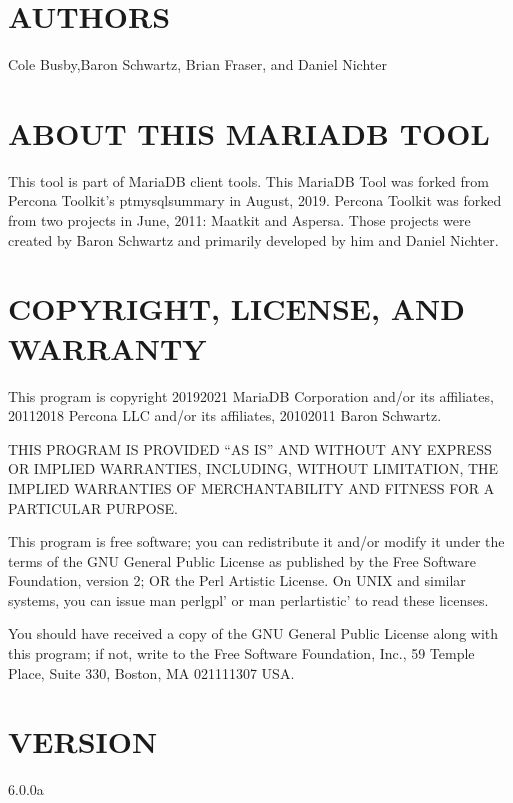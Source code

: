 \documentclass[letterpaper,10pt,english]{sphinxmanual}
\begin{document}
\section{AUTHORS}
\label{\detokenize{mariadb-database-summary:authors}}
Cole Busby,Baron Schwartz, Brian Fraser, and Daniel Nichter


\section{ABOUT THIS MARIADB TOOL}
\label{\detokenize{mariadb-database-summary:about-this-mariadb-tool}}
This tool is part of MariaDB client tools. This MariaDB Tool was forked from
Percona Toolkit’s pt\sphinxhyphen{}mysql\sphinxhyphen{}summary in August, 2019. Percona Toolkit was forked
from two projects in June, 2011: Maatkit and Aspersa.  Those projects were
created by Baron Schwartz and primarily developed by him and Daniel Nichter.


\section{COPYRIGHT, LICENSE, AND WARRANTY}
\label{\detokenize{mariadb-database-summary:copyright-license-and-warranty}}
This program is copyright 2019\sphinxhyphen{}2021 MariaDB Corporation and/or its affiliates,
2011\sphinxhyphen{}2018 Percona LLC and/or its affiliates, 2010\sphinxhyphen{}2011 Baron Schwartz.

THIS PROGRAM IS PROVIDED “AS IS” AND WITHOUT ANY EXPRESS OR IMPLIED
WARRANTIES, INCLUDING, WITHOUT LIMITATION, THE IMPLIED WARRANTIES OF
MERCHANTABILITY AND FITNESS FOR A PARTICULAR PURPOSE.

This program is free software; you can redistribute it and/or modify it under
the terms of the GNU General Public License as published by the Free Software
Foundation, version 2; OR the Perl Artistic License.  On UNIX and similar
systems, you can issue \textasciigrave{}man perlgpl’ or \textasciigrave{}man perlartistic’ to read these
licenses.

You should have received a copy of the GNU General Public License along with
this program; if not, write to the Free Software Foundation, Inc., 59 Temple
Place, Suite 330, Boston, MA  02111\sphinxhyphen{}1307  USA.


\section{VERSION}
\label{\detokenize{mariadb-database-summary:version}}
 6.0.0a
\end{document}
